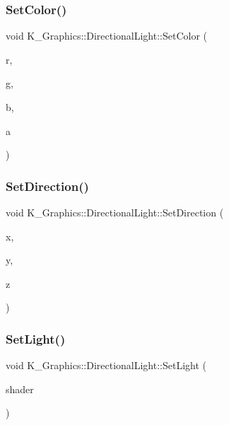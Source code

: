 \subsubsection{\texorpdfstring{Set\+Color()}{SetColor()}}
{\footnotesize\ttfamily void K\+\_\+\+Graphics\+::\+Directional\+Light\+::\+Set\+Color (\begin{DoxyParamCaption}\item[{float}]{r,  }\item[{float}]{g,  }\item[{float}]{b,  }\item[{float}]{a }\end{DoxyParamCaption})}

\mbox{\label{class_k___graphics_1_1_directional_light_a6efbacdc754be4209e5ddeb50fd7c3be}} 
\subsubsection{\texorpdfstring{Set\+Direction()}{SetDirection()}}
{\footnotesize\ttfamily void K\+\_\+\+Graphics\+::\+Directional\+Light\+::\+Set\+Direction (\begin{DoxyParamCaption}\item[{float}]{x,  }\item[{float}]{y,  }\item[{float}]{z }\end{DoxyParamCaption})}

\mbox{\label{class_k___graphics_1_1_directional_light_a402ab2c96733b3213ee79ee43b8b421b}} 
\subsubsection{\texorpdfstring{Set\+Light()}{SetLight()}}
{\footnotesize\ttfamily void K\+\_\+\+Graphics\+::\+Directional\+Light\+::\+Set\+Light (\begin{DoxyParamCaption}\item[{\mbox{\hyperlink{class_k___graphics_1_1_shader_class}{Shader\+Class}} $\ast$}]{shader }\end{DoxyParamCaption})}

